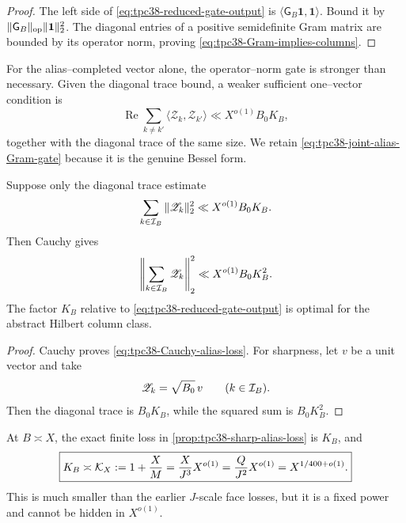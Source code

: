 \begin{proof}
The left side of \eqref{eq:tpc38-reduced-gate-output} is
\(\langle\mathsf G_B\mathbf1,\mathbf1\rangle\).  Bound it by
\(\|\mathsf G_B\|_{\operatorname{op}}\|\mathbf1\|_2^2\).
The diagonal entries of a positive semidefinite Gram matrix are bounded by
its operator norm, proving \eqref{eq:tpc38-Gram-implies-columns}.
\end{proof}

For the alias--completed vector alone, the operator--norm gate is stronger
than necessary.  Given the diagonal trace bound, a weaker sufficient
one--vector condition is
\begin{equation}
 \operatorname{Re}\sum_{k\ne k'}
 \langle\mathscr Z_k,\mathscr Z_{k'}\rangle
 \ll X^{o(1)}B_0K_B,
 \label{eq:tpc38-one-vector-offdiagonal-gate}
\end{equation}
together with the diagonal trace of the same size.  We retain
\eqref{eq:tpc38-joint-alias-Gram-gate} because it is the genuine Bessel
form.

\begin{proposition}
\label{prop:tpc38-sharp-alias-loss}
Suppose only the diagonal trace estimate
\begin{equation}
 \sum_{k\in\mathcal I_B}\|\mathscr Z_k\|_2^2
 \ll X^{o(1)}B_0K_B.
 \label{eq:tpc38-alias-diagonal-trace}
\end{equation}
Then Cauchy gives
\begin{equation}
 \left\|\sum_{k\in\mathcal I_B}\mathscr Z_k\right\|_2^2
 \ll X^{o(1)}B_0K_B^2.
 \label{eq:tpc38-Cauchy-alias-loss}
\end{equation}
The factor \(K_B\) relative to
\eqref{eq:tpc38-reduced-gate-output} is optimal for the abstract Hilbert
column class.
\end{proposition}

\begin{proof}
Cauchy proves \eqref{eq:tpc38-Cauchy-alias-loss}.  For sharpness, let \(v\)
be a unit vector and take
\begin{equation}
 \mathscr Z_k=\sqrt{B_0}\,v
 \qquad(k\in\mathcal I_B).
 \label{eq:tpc38-rank-one-alias-witness}
\end{equation}
Then the diagonal trace is \(B_0K_B\), while the squared sum is
\(B_0K_B^2\).
\end{proof}

At \(B\asymp X\), the exact finite loss in
\cref{prop:tpc38-sharp-alias-loss} is \(K_B\), and
\begin{equation}
 \boxed{
 K_B\asymp\mathcal K_X:=1+\frac XM
 =\frac X{J^3}X^{o(1)}
 =\frac Q{J^2}X^{o(1)}
 =X^{1/400+o(1)}.}
 \label{eq:tpc38-missing-KX}
\end{equation}
This is much smaller than the earlier \(J\)-scale face losses, but it is a
fixed power and cannot be hidden in \(X^{o(1)}\).

